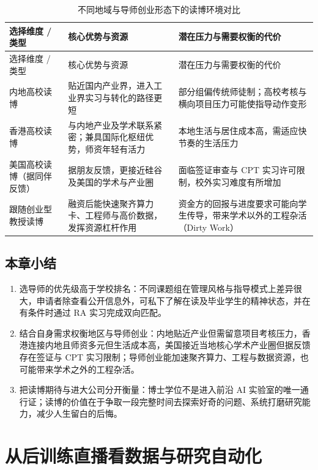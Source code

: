 \documentclass[UTF8,a4paper,11pt,fontset=fandol]{ctexart}
\begin{document}
\begin{longtable}{>{\raggedright\arraybackslash}p{\dimexpr(\linewidth-6\tabcolsep)/3\relax}>{\raggedright\arraybackslash}p{\dimexpr(\linewidth-6\tabcolsep)/3\relax}>{\raggedright\arraybackslash}p{\dimexpr(\linewidth-6\tabcolsep)/3\relax}}
\caption{不同地域与导师创业形态下的读博环境对比}\\
\toprule
选择维度 / 类型 & 核心优势与资源 & 潜在压力与需要权衡的代价\\\midrule
\endfirsthead
\toprule
选择维度 / 类型 & 核心优势与资源 & 潜在压力与需要权衡的代价\\\midrule
\endhead
内地高校读博 & 贴近国内产业界，进入工业界实习与转化的路径更短 & 部分组偏传统师徒制；高校考核与横向项目压力可能使指导动作变形\\[4pt]
香港高校读博 & 与内地产业及学术联系紧密；兼具国际化枢纽优势，师资年轻有活力 & 本地生活与居住成本高，需适应快节奏的生活压力\\[4pt]
美国高校读博（据同伴反馈） & 据朋友反馈，更接近硅谷及美国的学术与产业圈 & 面临签证审查与 CPT 实习许可限制，校外实习难度有所增加\\[4pt]
跟随创业型教授读博 & 融资后能快速聚齐算力卡、工程师与高价数据，发挥资源杠杆作用 & 资金方的回报与进度要求可能向学生传导，带来学术以外的工程杂活（Dirty Work）\\[4pt]
\bottomrule\end{longtable}\endgroup
{}\subsection{本章小结}
\begin{enumerate}
\item 选导师的优先级高于学校排名：不同课题组在管理风格与指导模式上差异很大，申请者除查看公开信息外，可私下了解在读及毕业学生的精神状态，并在有条件时通过 RA 实习完成双向匹配。
\item 结合自身需求权衡地区与导师创业：内地贴近产业但需留意项目考核压力，香港连接内地且师资多元但生活成本高，美国接近当地核心学术产业圈但据反馈存在签证与 CPT 实习限制；导师创业能加速聚齐算力、工程与数据资源，也可能带来学术之外的工程杂活。
\item 把读博期待与进大公司分开衡量：博士学位不是进入前沿 AI 实验室的唯一通行证；读博的价值在于争取一段完整时间去探索好奇的问题、系统打磨研究能力，减少人生留白的后悔。
\end{enumerate}
\section{从后训练直播看数据与研究自动化}
\end{document}
